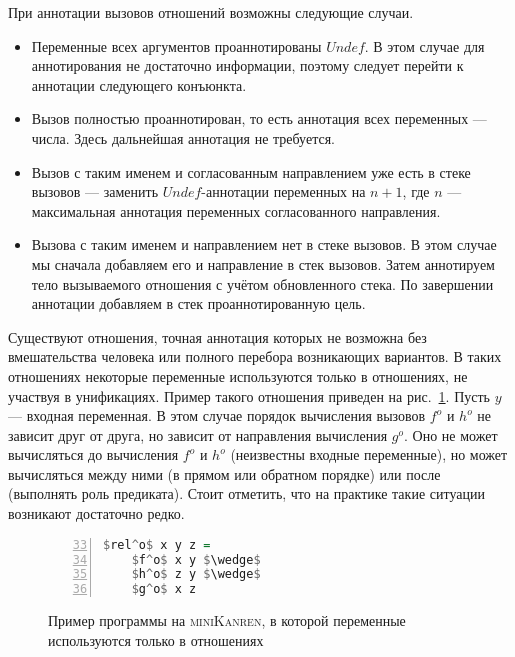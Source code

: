 \documentclass[conference,a4paper,american,russian]{IEEEtran}
\newcommand{\miniKanren}{\textsc{miniKanren}}
\begin{document}
При аннотации вызовов отношений возможны следующие случаи.
\begin{itemize}
    \item Переменные всех аргументов проаннотированы $Undef$. В этом случае для аннотирования не достаточно информации, поэтому следует перейти к аннотации следующего конъюнкта.
    \item Вызов полностью проаннотирован, то есть аннотация всех переменных --- числа. Здесь дальнейшая аннотация не требуется.
    \item Вызов с таким именем и согласованным направлением уже есть в стеке вызовов --- заменить $Undef$-аннотации переменных на $n+1$, где $n$ --- максимальная аннотация переменных согласованного направления.
    \item Вызова с таким именем и направлением нет в стеке вызовов.
    В этом случае мы сначала добавляем его и направление в стек вызовов.
    Затем аннотируем тело вызываемого отношения с учётом обновленного стека.
    По завершении аннотации добавляем в стек проаннотированную цель.
\end{itemize}

Существуют отношения, точная аннотация которых не возможна без вмешательства человека или полного перебора возникающих вариантов.
В таких отношениях некоторые переменные используются только в отношениях, не участвуя в унификациях.
Пример такого отношения приведен на рис.~\ref{lst:reloDEF}.
Пусть $y$ --- входная переменная.
В этом случае порядок вычисления вызовов $f^o$ и $h^o$ не зависит друг от друга, но зависит от направления вычисления $g^o$.
Оно не может вычисляться до вычисления $f^o$ и $h^o$ (неизвестны входные переменные), но может вычисляться между ними (в прямом или обратном порядке) или после (выполнять роль предиката).
Стоит отметить, что на практике такие ситуации возникают достаточно редко.

\begin{figure}[h!]
  \begin{center}
  \begin{minipage}{0.18\textwidth}
  \begin{lstlisting}[language=Haskell, frame=single, numbers=left,numberstyle=\small, firstnumber=33, escapechar=|]
  $rel^o$ x y z =
    $f^o$ x y $\wedge$
    $h^o$ z y $\wedge$
    $g^o$ x z
    \end{lstlisting}
  \end{minipage}
  \end{center}
  \caption{Пример программы на \miniKanren{}, в которой переменные используются только в отношениях}
  \label{lst:reloDEF}
\end{figure}
\end{document}
